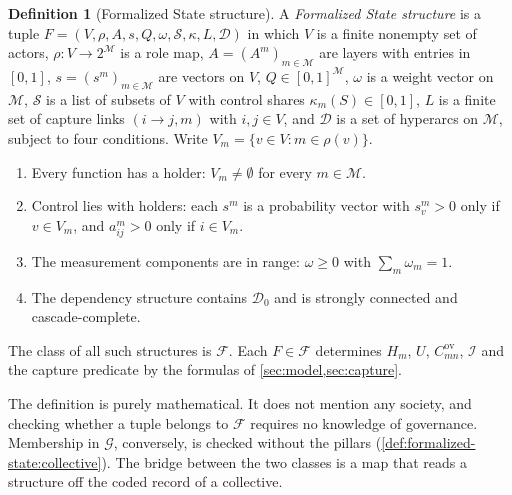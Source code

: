 \documentclass[11pt,letterpaper]{article}
\theoremstyle{definition}
\newtheorem{definition}[theorem]{Definition}
\theoremstyle{remark}
\newcommand{\Mset}{\mathcal{M}}
\newcommand{\Integ}{\mathcal{I}}
\newcommand{\Dzero}{\mathcal{D}_0}
\newcommand{\ov}{\mathrm{ov}}
\begin{document}
\begin{definition}[Formalized State structure]
\label{def:formalized-state:F}
A \emph{Formalized State structure} is a tuple $F=(V,\rho,A,s,Q,\omega,\mathcal{S},\kappa,L,\mathcal{D})$ in which $V$ is a finite nonempty set of actors, $\rho:V\to2^{\Mset}$ is a role map, $A=(A^m)_{m\in\Mset}$ are layers with entries in $[0,1]$, $s=(s^m)_{m\in\Mset}$ are vectors on $V$, $Q\in[0,1]^{\Mset}$, $\omega$ is a weight vector on $\Mset$, $\mathcal{S}$ is a list of subsets of $V$ with control shares $\kappa_m(S)\in[0,1]$, $L$ is a finite set of capture links $(i\to j,m)$ with $i,j\in V$, and $\mathcal{D}$ is a set of hyperarcs on $\Mset$, subject to four conditions. Write $V_m=\{v\in V:m\in\rho(v)\}$.
\begin{enumerate}[label=(F\arabic*)]
\item Every function has a holder: $V_m\neq\emptyset$ for every $m\in\Mset$.
\item Control lies with holders: each $s^m$ is a probability vector with $s^m_v>0$ only if $v\in V_m$, and $a^m_{ij}>0$ only if $i\in V_m$.
\item The measurement components are in range: $\omega\ge0$ with $\sum_m\omega_m=1$.
\item The dependency structure contains $\Dzero$ and is strongly connected and cascade-complete.
\end{enumerate}
The class of all such structures is $\mathcal{F}$. Each $F\in\mathcal{F}$ determines $H_m$, $U$, $C^{\ov}_{mn}$, $\Integ$ and the capture predicate by the formulas of \cref{sec:model,sec:capture}.
\end{definition}

The definition is purely mathematical. It does not mention any society, and checking whether a tuple belongs to $\mathcal{F}$ requires no knowledge of governance. Membership in $\mathcal{G}$, conversely, is checked without the pillars (\cref{def:formalized-state:collective}). The bridge between the two classes is a map that reads a structure off the coded record of a collective.
\end{document}
